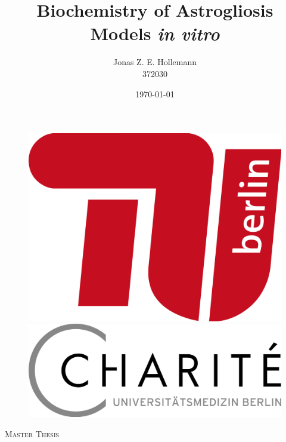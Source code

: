 \documentclass[a4paper,11pt,bibtotocnumbered]{article}
\begin{document}
\title{Biochemistry of Astrogliosis Models \textit{in vitro}}

\author{Jonas Z. E. Hollemann\\
372030}
\date{\today}


\begin{titlepage}
	\centering
	\begin{figure}
   \begin{minipage}[b]{.15\linewidth} %
      \includegraphics[width=\linewidth]{Logo.png}
   \end{minipage}
   \hspace{.7\linewidth}%
   \begin{minipage}[b]{.2\linewidth} %
      \includegraphics[width=\linewidth]{LogoCharite.png}
   \end{minipage}
\end{figure}
	{\scshape\LARGE Master Thesis\par}
	\vspace{1cm}

\end{titlepage}
\end{document}
